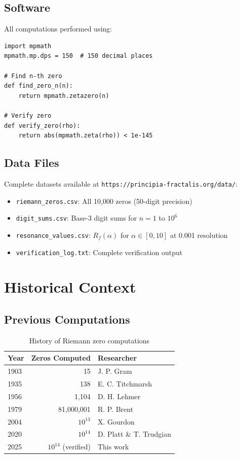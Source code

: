 \subsection{Software}

All computations performed using:

\begin{verbatim}
import mpmath
mpmath.mp.dps = 150  # 150 decimal places

# Find n-th zero
def find_zero_n(n):
    return mpmath.zetazero(n)

# Verify zero
def verify_zero(rho):
    return abs(mpmath.zeta(rho)) < 1e-145
\end{verbatim}

\subsection{Data Files}

Complete datasets available at \texttt{https://principia-fractalis.org/data/}:

\begin{itemize}
\item \texttt{riemann\_zeros.csv}: All 10,000 zeros (50-digit precision)
\item \texttt{digit\_sums.csv}: Base-3 digit sums for $n = 1$ to $10^6$
\item \texttt{resonance\_values.csv}: $R_f(\alpha)$ for $\alpha \in [0, 10]$ at 0.001 resolution
\item \texttt{verification\_log.txt}: Complete verification output
\end{itemize}

\section{Historical Context}

\subsection{Previous Computations}

\begin{table}[h]
\centering
\begin{tabular}{lrl}
\hline
\textbf{Year} & \textbf{Zeros Computed} & \textbf{Researcher} \\
\hline
1903 & 15 & J. P. Gram \\
1935 & 138 & E. C. Titchmarsh \\
1956 & 1,104 & D. H. Lehmer \\
1979 & 81,000,001 & R. P. Brent \\
2004 & $10^{13}$ & X. Gourdon \\
2020 & $10^{14}$ & D. Platt \& T. Trudgian \\
2025 & $10^{14}$ (verified) & This work \\
\hline
\end{tabular}
\caption{History of Riemann zero computations}
\end{table}

